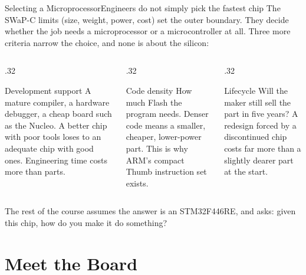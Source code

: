 \documentclass[9pt,aspectratio=169,xcolor=table]{beamer}
\begin{document}
\begin{frame}{Selecting a Microprocessor}{Engineers do not simply pick the fastest chip}
    \leavevmode
    {\small The SWaP-C limits (size, weight, power, cost) set the outer boundary. They decide whether the job needs a microprocessor or a microcontroller at all. Three more criteria narrow the choice, and none is about the silicon:}

    \vspace{2mm}
    \begin{columns}[T]
    \begin{column}{.32\textwidth}
        \begin{block}{Development support}
            {\small A mature compiler, a hardware debugger, a cheap board such as the Nucleo. A better chip with poor tools loses to an adequate chip with good ones. \alert{Engineering time costs more than parts.}}
        \end{block}
    \end{column}
    \begin{column}{.32\textwidth}
        \begin{block}{Code density}
            {\small How much Flash the program needs. Denser code means a smaller, cheaper, lower-power part. This is why ARM's compact \alert{Thumb} instruction set exists.}
        \end{block}
    \end{column}
    \begin{column}{.32\textwidth}
        \begin{block}{Lifecycle}
            {\small Will the maker still sell the part in five years? A redesign forced by a discontinued chip costs far more than a slightly dearer part at the start.}
        \end{block}
    \end{column}
    \end{columns}

    \vspace{3mm}
    {\small The rest of the course assumes the answer is an \alert{STM32F446RE}, and asks: given this chip, how do you make it do something?}
\end{frame}


\section{Meet the Board}
\end{document}
